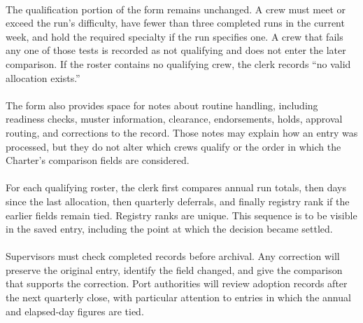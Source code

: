 \documentclass[9pt]{article}
\begin{document}
\begin{minipage}[t]{\textwidth}
\begin{minipage}[t]{0.49\textwidth}
\begin{exbox}
{  \  \\
  The qualification portion of the form remains unchanged. A crew must meet or exceed the run's difficulty, have fewer than three completed runs in the current week, and hold the required specialty if the run specifies one. A crew that fails any one of those tests is recorded as not qualifying and does not enter the later comparison. If the roster contains no qualifying crew, the clerk records ``no valid allocation exists.'' \\
  \  \\
  The form also provides space for notes about routine handling, including readiness checks, muster information, clearance, endorsements, holds, approval routing, and corrections to the record. Those notes may explain how an entry was processed, but they do not alter which crews qualify or the order in which the Charter's comparison fields are considered. \\
  \  \\
  For each qualifying roster, the clerk first compares annual run totals, then days since the last allocation, then quarterly deferrals, and finally registry rank if the earlier fields remain tied. Registry ranks are unique. This sequence is to be visible in the saved entry, including the point at which the decision became settled. \\
  \  \\
  Supervisors must check completed records before archival. Any correction will preserve the original entry, identify the field changed, and give the comparison that supports the correction. Port authorities will review adoption records after the next quarterly close, with particular attention to entries in which the annual and elapsed-day figures are tied.}
\end{exbox}
\end{minipage}
\end{minipage}
\clearpage
\end{document}
